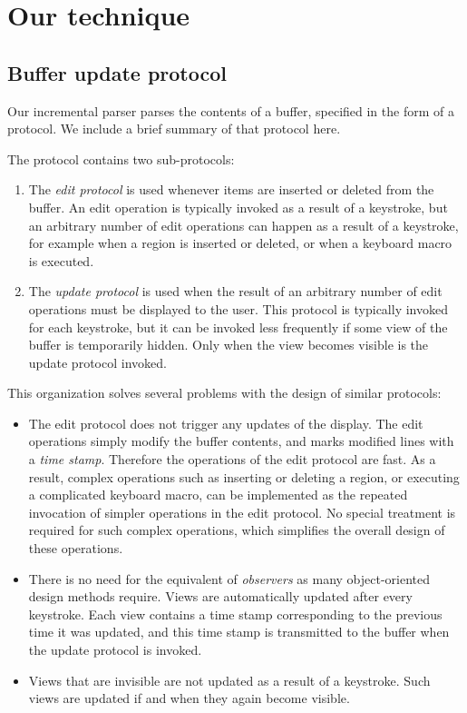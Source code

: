 \section{Our technique}

\subsection{Buffer update protocol}
\label{sec-buffer-update-protocol}

Our incremental parser parses the contents of a buffer, specified in
the form of a \clos{} protocol\cite{Strandh:2016:CPE:3005729.3005732}.
We include a brief summary of that protocol here.

The protocol contains two sub-protocols:

\begin{enumerate}
\item The \emph{edit protocol} is used whenever items are inserted or
  deleted from the buffer.  An edit operation is typically invoked as
  a result of a keystroke, but an arbitrary number of edit operations
  can happen as a result of a keystroke, for example when a region is
  inserted or deleted, or when a keyboard macro is executed.
\item The \emph{update protocol} is used when the result of an
  arbitrary number of edit operations must be displayed to the user.
  This protocol is typically invoked for each keystroke, but it can be
  invoked less frequently if some view of the buffer is temporarily
  hidden.  Only when the view becomes visible is the update protocol
  invoked.
\end{enumerate}

This organization solves several problems with the design of similar
protocols:

\begin{itemize}
\item The edit protocol does not trigger any updates of the display.
  The edit operations simply modify the buffer contents, and marks
  modified lines with a \emph{time stamp}.  Therefore the operations
  of the edit protocol are fast.  As a result, complex operations such
  as inserting or deleting a region, or executing a complicated
  keyboard macro, can be implemented as the repeated invocation of
  simpler operations in the edit protocol.  No special treatment is
  required for such complex operations, which simplifies the overall
  design of these operations.
\item There is no need for the equivalent of \emph{observers} as many
  object-oriented design methods require.  Views are automatically
  updated after every keystroke.  Each view contains a time stamp
  corresponding to the previous time it was updated, and this time
  stamp is transmitted to the buffer when the update protocol is
  invoked.
\item Views that are invisible are not updated as a result of a
  keystroke.  Such views are updated if and when they again become
  visible.
\end{itemize}

